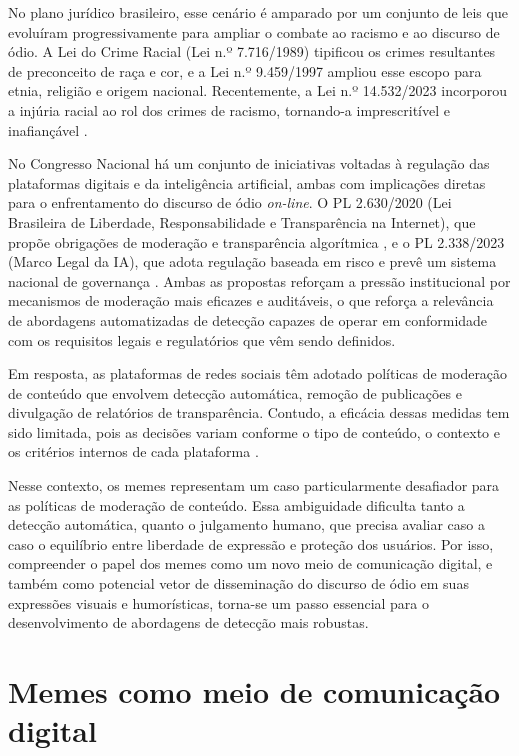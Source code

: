 No plano jurídico brasileiro, esse cenário é amparado por um conjunto de leis que evoluíram progressivamente para ampliar o combate ao racismo e ao discurso de ódio. A Lei do Crime Racial (Lei n.º 7.716/1989) tipificou os crimes resultantes de preconceito de raça e cor, e a Lei n.º 9.459/1997 ampliou esse escopo para etnia, religião e origem nacional. Recentemente, a Lei n.º 14.532/2023 incorporou a injúria racial ao rol dos crimes de racismo, tornando-a imprescritível e inafiançável \cite{brasil2023lei14532}.

No Congresso Nacional há um conjunto de iniciativas voltadas à regulação das plataformas digitais e da inteligência artificial, ambas com implicações diretas para o enfrentamento do discurso de ódio \textit{on-line}. O PL 2.630/2020 (Lei Brasileira de Liberdade, Responsabilidade e Transparência na Internet), que propõe obrigações de moderação e transparência algorítmica \cite{GovBR2025, camara2630}, e o PL 2.338/2023 (Marco Legal da IA), que adota regulação baseada em risco e prevê um sistema nacional de governança \cite{senado2338, camara2338}. Ambas as propostas reforçam a pressão institucional por mecanismos de moderação mais eficazes e auditáveis, o que reforça a relevância de abordagens automatizadas de detecção capazes de operar em conformidade com os requisitos legais e regulatórios que vêm sendo definidos.

Em resposta, as plataformas de redes sociais têm adotado políticas de moderação de conteúdo que envolvem detecção automática, remoção de publicações e divulgação de relatórios de transparência. Contudo, a eficácia dessas medidas tem sido limitada, pois as decisões variam conforme o tipo de conteúdo, o contexto e os critérios internos de cada plataforma \cite{dergacheva2023}.

Nesse contexto, os memes representam um caso particularmente desafiador para as políticas de moderação de conteúdo. Essa ambiguidade dificulta tanto a detecção automática, quanto o julgamento humano, que precisa avaliar caso a caso o equilíbrio entre liberdade de expressão e proteção dos usuários. Por isso, compreender o papel dos memes como um novo meio de comunicação digital, e também como potencial vetor de disseminação do discurso de ódio em suas expressões visuais e humorísticas, torna-se um passo essencial para o desenvolvimento de abordagens de detecção mais robustas.


\section{Memes como meio de comunicação digital}

